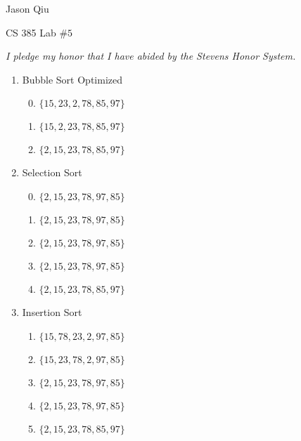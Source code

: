 \documentclass[a4paper,10pt]{article}
\begin{document}
Jason Qiu

CS 385 Lab $\#5$

\emph{I pledge my honor that I have abided by the Stevens Honor System.}

\begin{enumerate}[1.]
\item Bubble Sort Optimized \begin{enumerate}[(1)]
	\setcounter{enumii}{-1}
	\item $\{15, 23, 2, 78, 85, 97\}$
	\item $\{15, 2, 23, 78, 85, 97\}$
	\item $\{2, 15, 23, 78, 85, 97\}$
\end{enumerate}
\item Selection Sort \begin{enumerate}[(1)]
	\setcounter{enumii}{-1}
	\item $\{2, 15, 23, 78, 97, 85\}$
	\item $\{2, 15, 23, 78, 97, 85\}$
	\item $\{2, 15, 23, 78, 97, 85\}$
	\item $\{2, 15, 23, 78, 97, 85\}$
	\item $\{2, 15, 23, 78, 85, 97\}$
\end{enumerate}
\item Insertion Sort \begin{enumerate}[(1)]
	\item $\{15, 78, 23, 2, 97, 85\}$
	\item $\{15, 23, 78, 2, 97, 85\}$
	\item $\{2, 15, 23, 78, 97, 85\}$
\item $\{2, 15, 23, 78, 97, 85\}$
	\item $\{2, 15, 23, 78, 85, 97\}$
\end{enumerate}
\end{enumerate}
\end{document}
